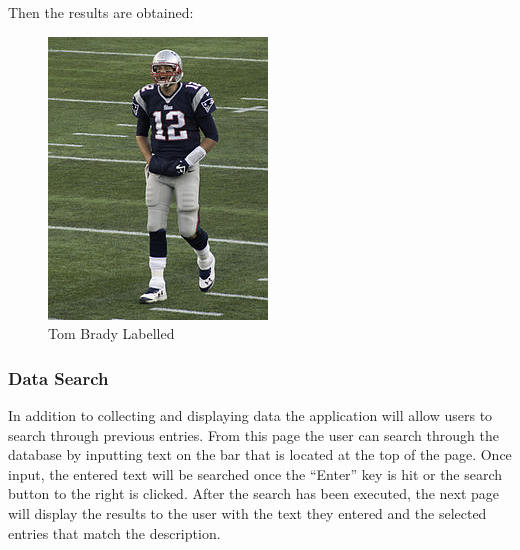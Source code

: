 \documentclass{scrreprt}
\begin{document}
Then the results are obtained:

\begin{figure}
  \includegraphics[width=\linewidth]{tbrady.jpg}
  \caption{Tom Brady Labelled}
  \label{fig:labelledBrady}
\end{figure}


\subsubsection{Data Search}

In addition to collecting and displaying data the application will allow users
to search through previous entries. From this page the user can search through
the database by inputting text on the bar that is located at the top of the
page. Once input, the entered text will be searched once the ``Enter'' key is hit
or the search button to the right is clicked. After the search has been
executed, the next page will display the results to the user with the text they
entered and the selected entries that match the description.
\end{document}
